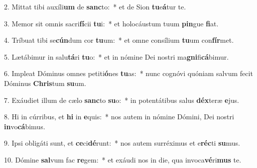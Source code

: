 2. Mittat tibi auxíli\textbf{um} de \textbf{sanc}to:~*  et de Sion \textbf{tu}e\textbf{á}tur te.\

3. Memor sit omnis sacri\textbf{fí}cii \textbf{tu}i:~*  et holocáustum tuum \textbf{pin}gue \textbf{fi}at.\

4. Tríbuat tibi se\textbf{cún}dum cor \textbf{tu}um:~*  et omne consílium \textbf{tu}um con\textbf{fír}met.\

5. Lætábimur in salu\textbf{tá}ri \textbf{tu}o:~*  et in nómine Dei nostri ma\textbf{gni}fi\textbf{cá}bimur.\

6. Impleat Dóminus omnes petiti\textbf{ó}nes \textbf{tu}as:~*  nunc cognóvi quóniam salvum fecit Dóminus \textbf{Chris}tum \textbf{su}um.\

7. Exáudiet illum de cælo \textbf{sanc}to \textbf{su}o:~*  in potentátibus salus \textbf{déx}teræ \textbf{e}jus.\

8. Hi in cúrribus, et \textbf{hi} in \textbf{e}quis:~*  nos autem in nómine Dómini, Dei nostri \textbf{in}vo\textbf{cá}bimus.\

9. Ipsi obligáti sunt, et \textbf{ce}ci\textbf{dé}runt:~*  nos autem surréximus et e\textbf{réc}ti \textbf{su}mus.\

10. Dómine \textbf{sal}vum fac \textbf{re}gem:~*  et exáudi nos in die, qua invoca\textbf{vé}ri\textbf{mus} te.\

